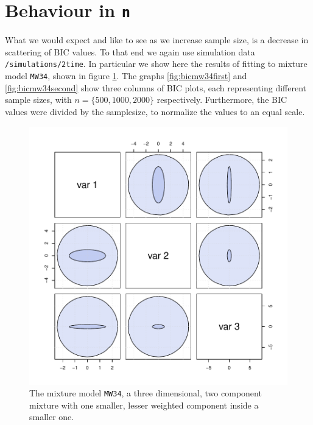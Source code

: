 \clearpage

\section{Behaviour in {\tt n}}
\label{sec:ben}

What we would expect and like to see as we increase sample size, is a decrease
in scattering of BIC values. To that end we again use simulation data 
{\tt /simulations/2time}. In particular we show here the results of fitting to 
mixture model {\tt MW34}, shown in figure \ref{fig:MW34}. The graphs 
\ref{fig:bicmw34first} and \ref{fig:bicmw34second} show three columns
of BIC plots, each representing different sample sizes, with 
$n = \{500, 1000, 2000\}$ respectively. Furthermore, the BIC values were 
divided by the samplesize, to normalize the values to an equal scale.

\begin{figure}[h]
    \begin{Rgraph}[0.9]
\includegraphics{chapter3-figMW34}
    \caption{The mixture model {\tt MW34}, a three dimensional, two component
             mixture with one smaller, lesser weighted component inside a 
             smaller one.}
    \label{fig:MW34}
    \end{Rgraph}
\end{figure}


